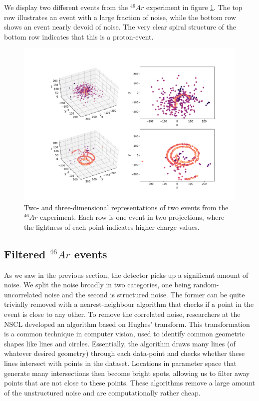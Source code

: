 We display two different events from the ${}^{46}Ar$ experiment in figure \ref{fig:samples}. The top row illustrates an event with a large fraction of noise, while the bottom row shows an event nearly devoid of noise. The very clear spiral structure of the bottom row indicates that this is a proton-event.

\begin{figure}[H]
\centering
\includegraphics[width=\textwidth]{../plots/display_eventsfull_.pdf}
\caption[Displaying un-filtered events in 2D and 3D]{Two- and three-dimensional representations of two events from the ${}^{46}Ar$ experiment. Each row is one event in two projections, where the lightness of each point indicates higher charge values.}\label{fig:samples}
\end{figure}

\subsection{Filtered \texorpdfstring{${}^{46}Ar$}{46Ar} events}\label{sec:filtered}

As we saw in the previous section, the detector picks up a significant amount of noise. We split the noise broadly in two categories,  one being random-uncorrelated noise and the second is structured noise. The former can be quite trivially removed with a nearest-neighbour algorithm that checks if a point in the event is close to any other. To remove the correlated noise, researchers at the NSCL developed an algorithm based on Hughes' transform. This transformation is a common technique in computer vision, used to identify common geometric shapes like lines and circles. Essentially, the algorithm draws many lines (of whatever desired geometry) through each data-point and checks whether these lines intersect with points in the dataset. Locations in parameter space that generate many intersections then become bright spots, allowing us to filter away points that are not close to these points. These algorithms remove a large amount of the unstructured noise and are computationally rather cheap.

